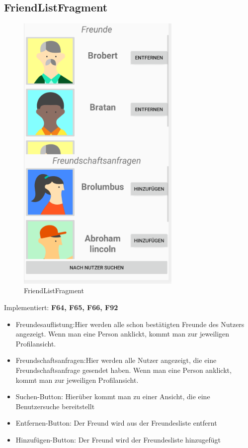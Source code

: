 \subsection{FriendListFragment}
\begin{figure}[H]
	\centering
	
	\includegraphics[width=0.7\textwidth]{pics/friendListFragment.png}%
	\caption{FriendListFragment}%
	\label{view}%
\end{figure}
Implementiert: \textbf{F64, F65, F66, F92}
\begin{itemize}[nosep]
	\item Freundesauflistung:Hier werden alle schon bestätigten Freunde des Nutzers angezeigt. Wenn man eine Person anklickt, kommt man zur jeweiligen Profilansicht.  
	
	\item Freundschaftsanfragen:Hier werden alle Nutzer angezeigt, die eine Freundschaftsanfrage gesendet haben. Wenn man eine Person anklickt, kommt man zur jeweiligen Profilansicht. 
	\item Suchen-Button: Hierüber kommt man zu einer Ansicht, die eine Benutzersuche bereitstellt
	\item Entfernen-Button: Der Freund wird aus der Freundesliste entfernt
	\item Hinzufügen-Button: Der Freund wird der Freundesliste hinzugefügt
\end{itemize}


